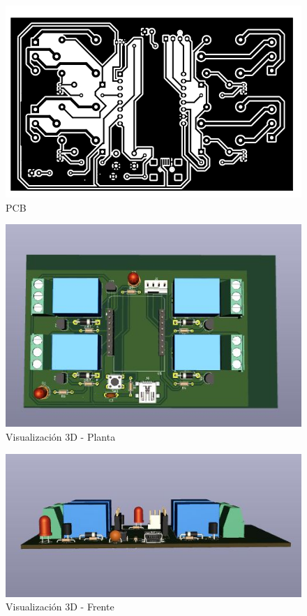 \documentclass[oneside]{article}
\begin{document}
\begin{figure}[H]
\centering
\includegraphics[scale=0.65]{images/pcb.jpg}
\caption{PCB}
\end{figure}


\begin{figure}[H]
\centering
\includegraphics[scale=1]{images/vista_planta.jpg}
\caption{Visualización 3D - Planta}
\end{figure}

\begin{figure}[H]
\centering
\includegraphics[scale=1]{images/vista_frente.jpg}
\caption{Visualización 3D - Frente}
\end{figure}
\end{document}
